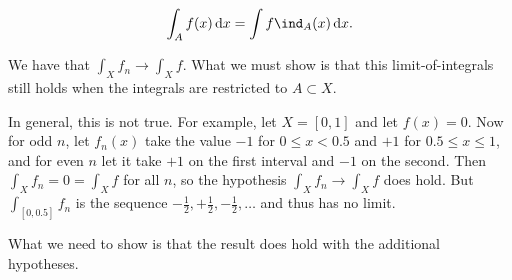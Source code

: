 \begin{align*}
  \int_A f(x) \dx = \int f\ind_A(x) \dx.
\end{align*}
\begin{remark*}
  We have that $\int_X f_n \to \int_X f$. What we must show is that this limit-of-integrals still holds when
  the integrals are restricted to $A \subset X$.

  In general, this is not true. For example, let $X = [0, 1]$ and let $f(x) = 0$. Now for odd $n$, let $f_n(x)$
  take the value $-1$ for $0 \leq x < 0.5$ and $+1$ for $0.5 \leq x \leq 1$, and for even $n$ let it take $+1$
  on the first interval and $-1$ on the second. Then $\int_X f_n = 0 = \int_X f$ for all $n$, so the
  hypothesis $\int_X f_n \to \int_X f$ does hold. But $\int_{[0, 0.5]} f_n$ is the
  sequence $-\frac{1}{2}, +\frac{1}{2}, -\frac{1}{2}, \ldots$ and thus has no limit.

  What we need to show is that the result does hold with the additional hypotheses.
\end{remark*}

